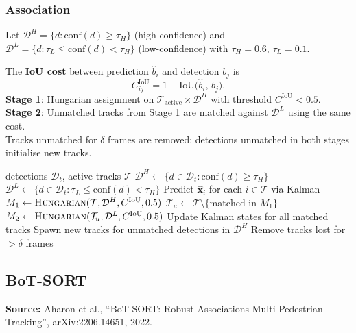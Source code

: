 \documentclass[11pt,a4paper]{article}
\begin{document}
\subsubsection*{Association}
Let $\mathcal{D}^H = \{d : \text{conf}(d) \ge \tau_H\}$ (high-confidence)
and $\mathcal{D}^L = \{d : \tau_L \le \text{conf}(d) < \tau_H\}$
(low-confidence) with $\tau_H = 0.6$, $\tau_L = 0.1$.

The \textbf{IoU cost} between prediction $\hat{b}_i$ and detection $b_j$ is
\begin{equation}
  C^{\text{IoU}}_{ij} = 1 - \text{IoU}\bigl(\hat{b}_i,\, b_j\bigr).
\end{equation}
\textbf{Stage 1}: Hungarian assignment on $\mathcal{T}_\text{active} \times
\mathcal{D}^H$ with threshold $C^{\text{IoU}} < 0.5$.\\
\textbf{Stage 2}: Unmatched tracks from Stage 1 are matched against
$\mathcal{D}^L$ using the same cost.\\
Tracks unmatched for $\delta$ frames are removed; detections unmatched in
both stages initialise new tracks.

\begin{algorithm}[H]
\caption{ByteTrack per-frame update}
\begin{algorithmic}[1]
\Require detections $\mathcal{D}_t$, active tracks $\mathcal{T}$
\State $\mathcal{D}^H \gets \{d \in \mathcal{D}_t : \text{conf}(d) \ge \tau_H\}$
\State $\mathcal{D}^L \gets \{d \in \mathcal{D}_t : \tau_L \le \text{conf}(d) < \tau_H\}$
\State Predict $\hat{\mathbf{x}}_i$ for each $i \in \mathcal{T}$ via Kalman
\State $M_1 \gets \textsc{Hungarian}(\mathcal{T}, \mathcal{D}^H, C^{\text{IoU}}, 0.5)$
\State $\mathcal{T}_u \gets \mathcal{T} \setminus \{\text{matched in } M_1\}$
\State $M_2 \gets \textsc{Hungarian}(\mathcal{T}_u, \mathcal{D}^L, C^{\text{IoU}}, 0.5)$
\State Update Kalman states for all matched tracks
\State Spawn new tracks for unmatched detections in $\mathcal{D}^H$
\State Remove tracks lost for $> \delta$ frames
\end{algorithmic}
\end{algorithm}

\subsection{BoT-SORT}

\textbf{Source:} Aharon et al., ``BoT-SORT: Robust Associations Multi-Pedestrian
Tracking'', arXiv:2206.14651, 2022.
\end{document}
